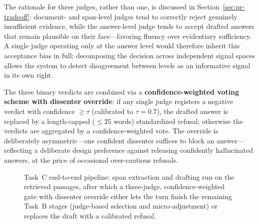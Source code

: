 The rationale for three judges, rather than one, is discussed in Section~\ref{sec:pr-tradeoff}: document- and span-level judges tend to correctly reject genuinely insufficient evidence, while the answer-level judge tends to accept drafted answers that remain plausible on their face---favoring fluency over evidentiary sufficiency. A single judge operating only at the answer level would therefore inherit this acceptance bias in full; decomposing the decision across independent signal spaces allows the system to detect disagreement between levels as an informative signal in its own right.

The three binary verdicts are combined via a \textbf{confidence-weighted voting scheme with dissenter override}: if any single judge registers a negative verdict with confidence $\geq \tau$ (calibrated to $\tau{=}0.7$), the drafted answer is replaced by a length-capped ($\leq 25$ words) standardized refusal; otherwise the verdicts are aggregated by a confidence-weighted vote. The override is deliberately asymmetric---one confident dissenter suffices to block an answer---reflecting a deliberate design preference against releasing confidently hallucinated answers, at the price of occasional over-cautious refusals.

\begin{figure}[h]
\centering
{}
\caption{Task~C end-to-end pipeline: span extraction and drafting run on the retrieved passages, after which a three-judge, confidence-weighted gate with dissenter override either lets the turn finish the remaining Task~B stages (judge-based selection and micro-adjustment) or replaces the draft with a calibrated refusal.}
\label{fig:taskC-en}
\end{figure}

